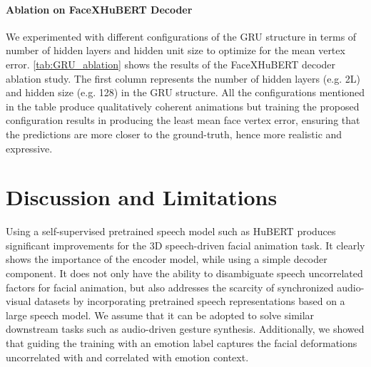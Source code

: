 \documentclass[10pt,twocolumn,letterpaper]{article}
\begin{document}
\paragraph{Ablation on FaceXHuBERT Decoder}
\label{sec:ablation_gru}
We experimented with different configurations of the GRU structure in terms of number of hidden layers and hidden unit size to optimize for the mean vertex error. \cref{tab:GRU_ablation} shows the results of the FaceXHuBERT decoder ablation study. The first column represents the number of hidden layers (e.g. 2L) and hidden size (e.g. 128) in the GRU structure. All the configurations mentioned in the table produce qualitatively coherent animations but training the proposed configuration results in producing the least mean face vertex error, ensuring that the predictions are more closer to the ground-truth, hence more realistic and expressive.



\section{Discussion and Limitations}
Using a self-supervised pretrained speech model such as HuBERT produces significant improvements for the 3D speech-driven facial animation task. It clearly shows the importance of the encoder model, while using a simple decoder component. It does not only have the ability to disambiguate speech uncorrelated factors for facial animation, but also addresses the scarcity of synchronized audio-visual datasets by incorporating pretrained speech representations based on a large speech model. We assume that it can be adopted to solve similar downstream tasks such as audio-driven gesture synthesis. Additionally, we showed that guiding the training with an emotion label captures the facial deformations uncorrelated with and correlated with emotion context. 
\end{document}
